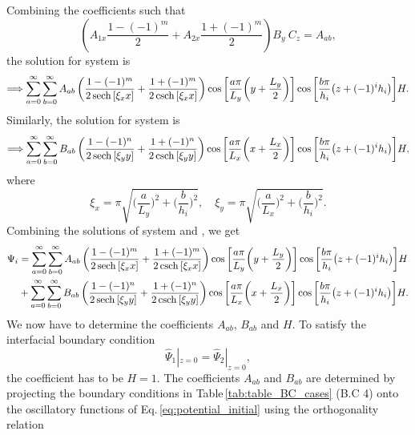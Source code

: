 \documentclass[aps,prfluids,reprint,superscriptaddress]{revtex4-2}
\newcommand{\nn}{\nonumber}
\newcommand{\RN}[1]{%
	\textup{\uppercase\expandafter{\romannumeral#1}}%
}
\numberwithin{equation}{section}
\begin{document}
Combining the coefficients such that
\begin{equation}
	\left(A_{1x} \frac{1-(-1)^m}{2} + A_{2x} \frac{1+(-1)^m}{2}\right)
	B_y\: C_z = A_{ab},
\end{equation}
the solution for system \RN{1} is
\begin{equation}
	\Longrightarrow
	\sum_{a=0}^{\infty} \sum_{b=0}^{\infty}
	A_{ab} 
	\left(\frac{1-(-1)^m}{2\sech{[\xi_x x]}} + \frac{1+(-1)^m}{2\csch{[\xi_x x]}}
	\right)
	\cos{\biggl[ \frac{a\pi}{L_y}\biggl(y + \frac{L_y}{2}\biggr)\biggr]}
	\cos{\biggl[ \frac{b\pi}{h_i}\bigl(z+(-1)^ih_i\bigr)\biggr]} H.
\end{equation}
Similarly, the solution for system \RN{2} is
\begin{equation}
	\Longrightarrow
	\sum_{a=0}^{\infty} \sum_{b=0}^{\infty}
	B_{ab} 
	\left(\frac{1-(-1)^n}{2\sech{[\xi_y y]}} + \frac{1+(-1)^n}{2\csch{[\xi_y y]}}
	\right)
	\cos{\biggl[ \frac{a\pi}{L_x}\biggl(x + \frac{L_x}{2}\biggr)\biggr]}
	\cos{\biggl[ \frac{b\pi}{h_i}\bigl(z+(-1)^ih_i\bigr)\biggr]} H,
\end{equation}
where
\begin{equation}
	\xi_x = \pi\sqrt{
	\biggl(\frac{a}{L_y}\biggr)^2 + \biggl(\frac{b}{h_i}\biggr)^2
	}, \quad
	\xi_y = \pi\sqrt{
		\biggl(\frac{a}{L_x}\biggr)^2 + \biggl(\frac{b}{h_i}\biggr)^2
	}.
\end{equation}
Combining the solutions of system \RN{1} and \RN{2}, we get
\begin{align}
	\nn
	\Psi_i &= 
	\sum_{a=0}^{\infty} \sum_{b=0}^{\infty}
	A_{ab} 
	\left(\frac{1-(-1)^m}{2\sech{[\xi_x x]}} + \frac{1+(-1)^m}{2\csch{[\xi_x x]}}
	\right)
	\cos{\biggl[ \frac{a\pi}{L_y}\biggl(y + \frac{L_y}{2}\biggr)\biggr]}
	\cos{\biggl[ \frac{b\pi}{h_i}\bigl(z+(-1)^ih_i\bigr)\biggr]} H
	 \\
	 &+ 
	 \sum_{a=0}^{\infty} \sum_{b=0}^{\infty}
	 B_{ab} 
	 \left(\frac{1-(-1)^n}{2\sech{[\xi_y y]}} + \frac{1+(-1)^n}{2\csch{[\xi_y y]}}
	 \right)
	 \cos{\biggl[ \frac{a\pi}{L_x}\biggl(x + \frac{L_x}{2}\biggr)\biggr]}
	 \cos{\biggl[ \frac{b\pi}{h_i}\bigl(z+(-1)^ih_i\bigr)\biggr]} H .
	 \label{eq:potential_initial}
\end{align}
We now have to determine the coefficients $A_{ab}$, $B_{ab}$ and $H$. To satisfy the interfacial boundary condition
\begin{equation}
	\widehat\Psi_1|_{z=0} = \widehat\Psi_2|_{z=0},
\end{equation}
the coefficient has to be $H=1$. The coefficients $A_{ab}$ and $B_{ab}$ are determined by projecting the boundary conditions in Table\,\ref{tab:table_BC_cases} (B.C 4) onto the oscillatory functions of Eq.\,\eqref{eq:potential_initial} using the orthogonality relation
\end{document}
